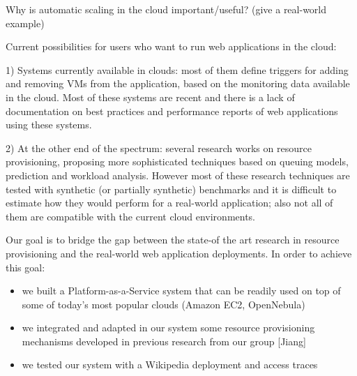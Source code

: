 Why is automatic scaling in the cloud important/useful? (give a real-world example)

Current possibilities for users who want to run web applications in the
cloud: 

1) Systems currently available in clouds: most of them define triggers for 
adding and removing VMs from the application, based on the monitoring 
data available in the cloud. Most of these systems are recent and there 
is a lack of documentation on best practices
and performance reports of web applications using these systems. 

2) At the other end of the spectrum: several research works on resource 
provisioning, proposing more sophisticated techniques based on
queuing models, prediction and workload analysis. However most of these
research techniques are tested with synthetic (or partially synthetic)
benchmarks and it is difficult to estimate how they would perform
for a real-world application; also not all of them are compatible
with the current cloud environments.

Our goal is to bridge the gap between the state-of the art research in
resource provisioning and the real-world web application deployments.
In order to achieve this goal:

\begin{itemize}
\item we built a Platform-as-a-Service system that can be readily used
on top of some of today's most popular clouds (Amazon EC2, OpenNebula)
\item we integrated and adapted in our system some resource  provisioning 
mechanisms developed in previous research from our group [Jiang]
\item we tested our system with a Wikipedia deployment and access
traces  
\end{itemize}   

